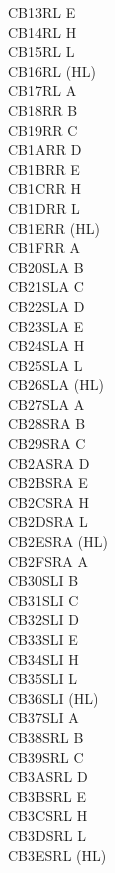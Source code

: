 \begin{multicols}{3}
{\begin{tabbing}
    CB13\>RL E\\
    CB14\>RL H\\
    CB15\>RL L\\
    CB16\>RL (HL)\\
    CB17\>RL A\\
    CB18\>RR B\\
    CB19\>RR C\\
    CB1A\>RR D\\
    CB1B\>RR E\\
    CB1C\>RR H\\
    CB1D\>RR L\\
    CB1E\>RR (HL)\\
    CB1F\>RR A\\
    CB20\>SLA B\\
    CB21\>SLA C\\
    CB22\>SLA D\\
    CB23\>SLA E\\
    CB24\>SLA H\\
    CB25\>SLA L\\
    CB26\>SLA (HL)\\
    CB27\>SLA A\\
    CB28\>SRA B\\
    CB29\>SRA C\\
    CB2A\>SRA D\\
    CB2B\>SRA E\\
    CB2C\>SRA H\\
    CB2D\>SRA L\\
    CB2E\>SRA (HL)\\
    CB2F\>SRA A\\
    CB30\>SLI B\UNDOC\\
    CB31\>SLI C\UNDOC\\
    CB32\>SLI D\UNDOC\\
    CB33\>SLI E\UNDOC\\
    CB34\>SLI H\UNDOC\\
    CB35\>SLI L\UNDOC\\
    CB36\>SLI (HL)\UNDOC\\
    CB37\>SLI A\UNDOC\\
    CB38\>SRL B\\
    CB39\>SRL C\\
    CB3A\>SRL D\\
    CB3B\>SRL E\\
    CB3C\>SRL H\\
    CB3D\>SRL L\\
    CB3E\>SRL (HL)\\

\end{tabbing}}
\end{multicols}
